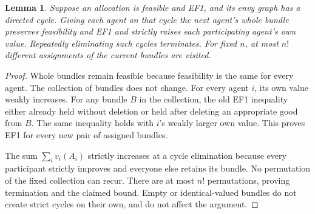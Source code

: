 \documentclass[11pt]{article}
\newtheorem{lemma}[theorem]{Lemma}
\theoremstyle{remark}
\begin{document}
\begin{lemma}\label{cycle}
Suppose an allocation is feasible and EF1, and its envy graph has a directed cycle. Giving each agent on that cycle the next agent's whole bundle preserves feasibility and EF1 and strictly raises each participating agent's own value. Repeatedly eliminating such cycles terminates. For fixed $n$, at most $n!$ different assignments of the current bundles are visited.
\end{lemma}
\begin{proof}
Whole bundles remain feasible because feasibility is the same for every agent. The collection of bundles does not change. For every agent $i$, its own value weakly increases. For any bundle $B$ in the collection, the old EF1 inequality either already held without deletion or held after deleting an appropriate good from $B$. The same inequality holds with $i$'s weakly larger own value. This proves EF1 for every new pair of assigned bundles.

The sum $\sum_i v_i(A_i)$ strictly increases at a cycle elimination because every participant strictly improves and everyone else retains its bundle. No permutation of the fixed collection can recur. There are at most $n!$ permutations, proving termination and the claimed bound. Empty or identical-valued bundles do not create strict cycles on their own, and do not affect the argument.
\end{proof}
\end{document}
